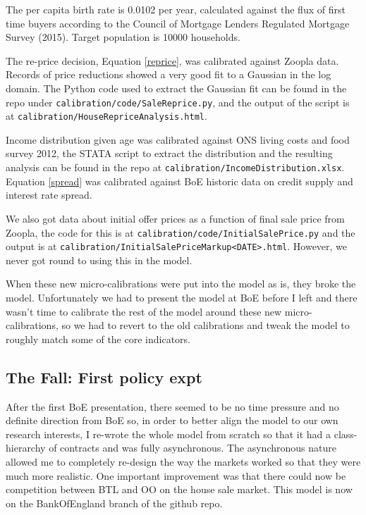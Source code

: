 \documentclass{report}
\begin{document}
The per capita birth rate is 0.0102 per year, calculated against the flux of first time buyers according to the Council of Mortgage Lenders Regulated Mortgage Survey (2015). Target population is 10000 households.

The re-price decision, Equation \ref{reprice}, was calibrated against Zoopla data. Records of price reductions showed a very good fit to a Gaussian in the log domain. The Python code used to extract the Gaussian fit can be found in the repo under \texttt{calibration/code/SaleReprice.py}, and the output of the script is at \texttt{calibration/HouseRepriceAnalysis.html}.

Income distribution given age was calibrated against ONS living costs and food survey 2012, the STATA script to extract the distribution and the resulting analysis can be found in the repo at \texttt{calibration/IncomeDistribution.xlsx}. Equation \ref{spread} was calibrated against BoE historic data on credit supply and interest rate spread.

We also got data about initial offer prices as a function of final sale price from Zoopla, the code for this is at \texttt{calibration/code/InitialSalePrice.py} and the output is at \texttt{calibration/InitialSalePriceMarkup<DATE>.html}. However, we never got round to using this in the model.

When these new micro-calibrations were put into the model as is, they broke the model. Unfortunately we had to present the model at BoE before I left and there wasn't time to calibrate the rest of the model around these new micro-calibrations, so we had to revert to the old calibrations and tweak the model to roughly match some of the core indicators.

\subsection{The Fall: First policy expt}

After the first BoE presentation, there seemed to be no time pressure and no definite direction from BoE so, in order to better align the model to our own research interests, I re-wrote the whole model from scratch so that it had a class-hierarchy of contracts and was fully asynchronous. The asynchronous nature allowed me to completely re-design the way the markets worked so that they were much more realistic. One important improvement was that there could now be competition between BTL and OO on the house sale market. This model is now on the BankOfEngland branch of the github repo.
\end{document}
